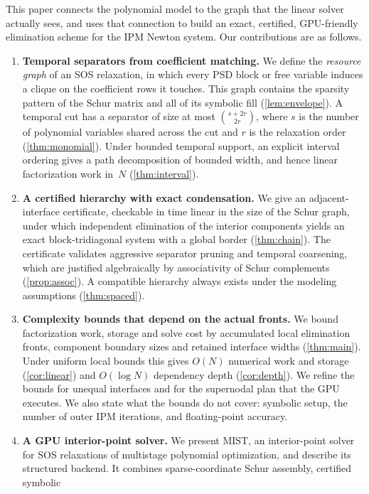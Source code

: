 This paper connects the polynomial model to the graph that the linear solver
actually sees, and uses that connection to build an exact, certified,
GPU-friendly elimination scheme for the IPM Newton system. Our contributions are
as follows.

\begin{enumerate}[leftmargin=*,itemsep=2pt]
\item \textbf{Temporal separators from coefficient matching.} We define the
  \emph{resource graph} of an SOS relaxation, in which every PSD block or free
  variable induces a clique on the coefficient rows it touches. This graph
  contains the sparsity pattern of the Schur matrix and all of its symbolic fill
  (\cref{lem:envelope}). A temporal cut has a separator of size at most
  $\binom{s+2r}{2r}$, where $s$ is the number of polynomial variables shared
  across the cut and $r$ is the relaxation order (\cref{thm:monomial}). Under
  bounded temporal support, an explicit interval ordering gives a path
  decomposition of bounded width, and hence linear factorization work in~$N$
  (\cref{thm:interval}).
\item \textbf{A certified hierarchy with exact condensation.} We give an
  adjacent-interface certificate, checkable in time linear in the size of the
  Schur graph, under which independent elimination of the interior components
  yields an exact block-tridiagonal system with a global border
  (\cref{thm:chain}). The certificate validates aggressive separator pruning and
  temporal coarsening, which are justified algebraically by associativity of
  Schur complements (\cref{prop:assoc}). A compatible hierarchy always exists
  under the modeling assumptions (\cref{thm:spaced}).
\item \textbf{Complexity bounds that depend on the actual fronts.} We bound
  factorization work, storage and solve cost by accumulated local elimination
  fronts, component boundary sizes and retained interface widths
  (\cref{thm:main}). Under uniform local bounds this gives $O(N)$ numerical work
  and storage (\cref{cor:linear}) and $O(\log N)$ dependency depth
  (\cref{cor:depth}). We refine the bounds for unequal interfaces and for the
  supernodal plan that the GPU executes. We also state what the bounds do not
  cover: symbolic setup, the number of outer IPM iterations, and floating-point
  accuracy.
\item \textbf{A GPU interior-point solver.} We present MIST, an
  interior-point solver for SOS relaxations of multistage polynomial
  optimization, and describe its structured backend. It combines sparse-coordinate Schur assembly, certified symbolic

\end{enumerate}
